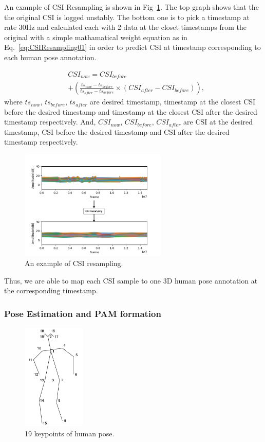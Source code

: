 \documentclass[10pt,letterpaper]{article}
\begin{document}
	An example of CSI Resampling is shown in Fig~\ref{fig:CSIResampling01}. The top graph shows that the the original CSI is logged unstably. The bottom one is to pick a timestamp at rate 30Hz and calculated each with 2 data at the closet timestamps from the original with a simple mathamatical weight equation as in Eq.~\ref{eq:CSIResampling01} in order to predict CSI at timestamp corresponding to each human pose annotation.
	
	\begin{equation}
	\begin{aligned}
	& CSI_{now} = CSI_{before} \\ 
	& + \left(  \frac{ts_{now}-ts_{before}}{ts_{after}-ts_{before}}  \times (CSI_{after}-CSI_{before})   \right),
	\label{eq:CSIResampling01}
	\end{aligned}
	\end{equation}
	where $ts_{now}$, $ts_{before}$, $ts_{after}$ are desired timestamp, timestamp at the closest CSI before the desired timestamp and timestamp at the closest CSI after the desired timestamp respectively. And, $CSI_{now}$, $CSI_{before}$, $CSI_{after}$ are CSI at the desired timestamp, CSI before the desired timestamp and CSI after the desired timestamp respectively.
	
	\begin{figure}[htbp]
		\centerline{\includegraphics[width=70mm,scale=0.5]{CSIResampling03.png}}
		\caption{An example of CSI resampling.}
		\label{fig:CSIResampling01}
	\end{figure}
	
	Thus, we are able to map each CSI sample to one 3D human pose annotation at the corresponding timestamp.
	
	
	\subsubsection*{Pose Estimation and PAM formation}
	
	
	\begin{figure}[htbp]
		\centerline{\includegraphics[width=30mm,scale=0.5]{POSEkeypoint02.png}}
		\caption{19 keypoints of human pose.}
		\label{fig:POSEkeypoint}
	\end{figure}
	
\end{document}

